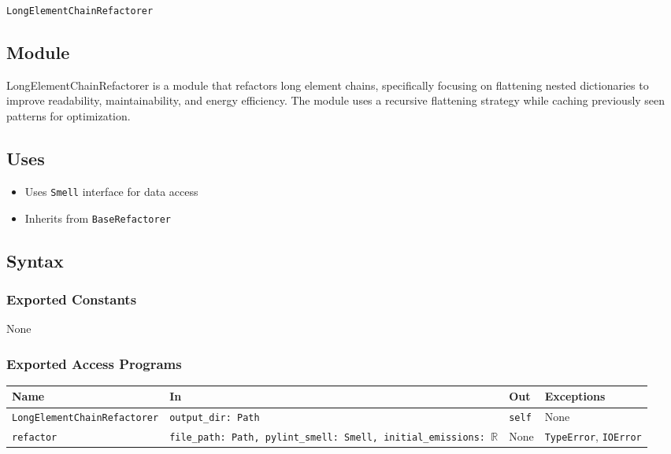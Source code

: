 \documentclass[12pt, titlepage]{article}
\begin{document}
\texttt{LongElementChainRefactorer}

\subsection{Module}

LongElementChainRefactorer is a module that refactors long element chains, specifically focusing on flattening nested dictionaries to improve readability, maintainability, and energy efficiency. The module uses a recursive flattening strategy while caching previously seen patterns for optimization.

\subsection{Uses}

\begin{itemize}
\item Uses \texttt{Smell} interface for data access
\item Inherits from \texttt{BaseRefactorer}
\end{itemize}

\subsection{Syntax}

\subsubsection{Exported Constants}
None

\subsubsection{Exported Access Programs}


\begin{center}
\begin{tabularx}{\linewidth}{|l|>{\raggedright\arraybackslash}X|l|l|}
\hline
\textbf{Name} & \textbf{In} & \textbf{Out} & \textbf{Exceptions} \\
\hline
\texttt{LongElementChainRefactorer} & \texttt{output\_dir: Path} & \texttt{self} & None \\
\hline
\texttt{refactor} & \texttt{file\_path: Path, pylint\_smell: Smell, initial\_emissions: $\mathbb{R}$} & None & \texttt{TypeError}, \texttt{IOError} \\
\hline
\end{tabularx}
\end{center}
\end{document}
